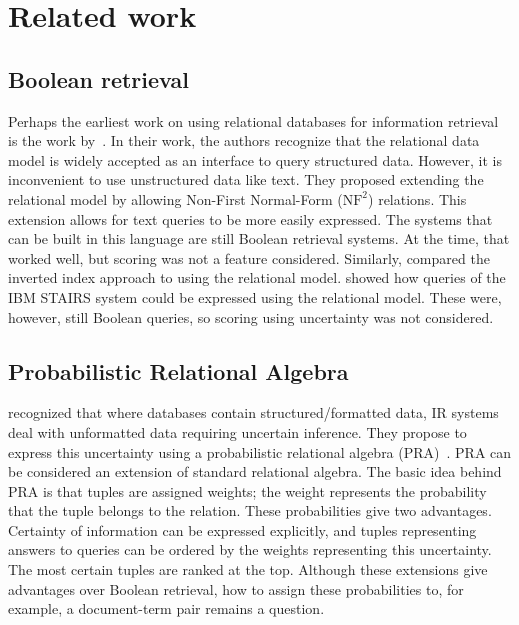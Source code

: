 \section{Related work}

\subsection{Boolean retrieval}
Perhaps the earliest work on using relational databases for information retrieval is the work by~\citet{SchekPistor}. In their work, the authors recognize that the relational data model is widely accepted as an interface to query structured data. However, it is inconvenient to use unstructured data like text. They proposed extending the relational model by allowing Non-First Normal-Form ($\text{NF}^2$) relations. This extension allows for text queries to be more easily expressed. The systems that can be built in this language are still Boolean retrieval systems. At the time, that worked well, but scoring was not a feature considered.  
Similarly, \citet{macleod} compared the inverted index approach to using the relational model.  showed how queries of the IBM STAIRS system could be expressed using the relational model. These were, however, still Boolean queries, so scoring using uncertainty was not considered. 

\subsection{Probabilistic Relational Algebra}
 recognized that where databases contain structured/formatted data, IR systems deal with unformatted data requiring uncertain inference. They propose to express this uncertainty using a probabilistic relational algebra (PRA)~\citep{fuhr-pra}. 
PRA can be considered an extension of standard relational algebra. 
The basic idea behind PRA is that tuples are assigned weights; the weight represents the probability that the tuple belongs to the relation. These probabilities give two advantages. Certainty of information can be expressed explicitly, and tuples representing answers to queries can be ordered by the weights representing this uncertainty. The most certain tuples are ranked at the top. Although these extensions give advantages over Boolean retrieval, how to assign these probabilities to, for example, a document-term pair remains a question.

